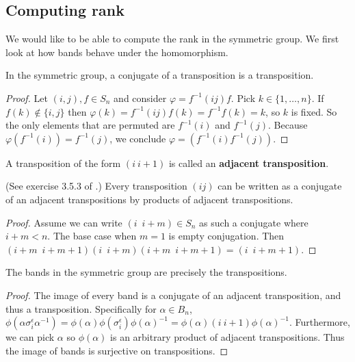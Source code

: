 \documentclass[12pt]{thesis}
\begin{document}
\subsection{Computing rank}

We would like to be able to compute the rank in the symmetric
group. We first look at how bands behave under the homomorphism.

\begin{lemma}
    In the symmetric group, a conjugate of a transposition is a transposition.
\end{lemma}

\begin{proof}
    Let $(i,j), f \in S_{n}$ and consider $\varphi = f^{-1}(i j)f$.
    Pick $k \in \{ 1, \ldots, n \}$. 
    If $f(k) \not \in \{ i, j \}$
    then $\varphi(k) = f^{-1}(i j)f(k) = f^{-1}f(k) = k$,
    so $k$ is fixed.
    So the only elements that are permuted
    are $f^{-1}(i)$ and $f^{-1}(j)$.
    Because $\varphi(f^{-1}(i)) = f^{-1}(j)$,
    we conclude $\varphi = (f^{-1}(i) f^{-1}(j))$.
\end{proof}

\begin{definition}
    A transposition of the form $(i\ i+1)$ is called an \textbf{adjacent transposition}.
\end{definition}

\begin{lemma}
    (See exercise 3.5.3 of \cite{dummit-and-foote}.)
    Every transposition $(i j)$ can be written
    as a conjugate of an adjacent transpositions
    by products of adjacent transpositions. 
\end{lemma}

\begin{proof}
    Assume we can write $(i\enspace  i + m) \in S_{n}$ as such a conjugate where $i + m < n$.
    The base case when $m = 1$ is empty conjugation.
    Then $(i + m\enspace i + m + 1) (i\enspace i + m) (i + m\enspace i + m + 1) = (i\enspace i + m + 1)$.
\end{proof}

\begin{proposition}
    \label{prop:bands-are-transpositions}
    The bands in the symmetric group are precisely the transpositions.
\end{proposition}

\begin{proof}
    The image of every band
    is a conjugate of an adjacent transposition,
    and thus a transposition.
    Specifically for $\alpha \in B_{n}$,
    $\phi(\alpha\sigma_{i}^{\epsilon}\alpha^{-1}) = \phi(\alpha)\phi(\sigma_{i}^{\epsilon})\phi(\alpha)^{-1} = \phi(\alpha) (i\ i+1) \phi(\alpha)^{-1}$.
    Furthermore, we can pick $\alpha$ so $\phi(\alpha)$ is an arbitrary
    product of adjacent transpositions.
    Thus the image of bands is surjective on transpositions.
\end{proof}
\end{document}
